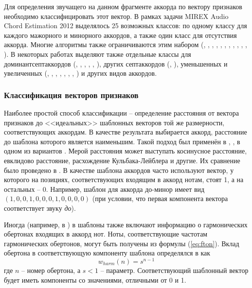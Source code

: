Для определения звучащего на данном фрагменте аккорда по вектору признаков
необходимо классифицировать этот вектор. В рамках задачи MIREX Audio Chord
Estimation 2012 выделялось 25 возможных классов: по одному классу для каждого
мажорного и минорного аккордов, а также один класс для отсутствия аккорда.
Многие алгоритмы также ограничиваются этим набором (\cite{Bello2005},
\cite{Lee2006}, \cite{Khadkevich2009}, \cite{Oudre2009}, \cite{Weller2009},
\cite{Cho2010}, \cite{Rocher2010}, \cite{Cho2011}, \cite{Jiang2011},
\cite{Ni2011}, \cite{Chen2012}, \cite{Humphrey2012}). В некоторых работах
выделяют также отдельные классы для доминантсептаккордов (\cite{Sheh2003},
\cite{Mauch2008}, \cite{Zhang2008}, \cite{Mauch2009}, \cite{Mauch2010},
\cite{DeHaas2012}), других септаккордов (\cite{Sheh2003}, \cite{Mauch2010}),
уменьшенных и увеличенных (\cite{Sheh2003}, \cite{Burgoyne2007},
\cite{Lee2008}, \cite{Mauch2008}, \cite{Sumi2008}, \cite{Mauch2009},
\cite{Mauch2010}, \cite{Ni2012}) и других видов аккордов.

\subsubsection{Классификация векторов признаков}

Наиболее простой способ классификации -- определение расстояния от вектора
признаков до <<идеальных>> шаблонных векторов той же размерности,
соответствующих аккордам. В качестве результата выбирается аккорд, расстояние до
шаблона которого является наименьшим. Такой подход был применён в
\cite{Lee2006}, \cite{Oudre2009}, в одном из вариантов \cite{Jiang2011}. Мерой
расстояния может выступать косинусное расстояние, евклидово расстояние,
расхождение Кульбака-Лейблера и другие. Их сравнение было проведено в
\cite{Oudre2009}. В качестве шаблона аккордов часто используют вектор, у
которого на позициях, соответствующих входящим в аккорд нотам, стоят 1, а на
остальных -- 0. Например, шаблон для аккорда до-минор имеет вид
$(1,0,0,1,0,0,0,1,0,0,0,0)$ (при условии, что первая компонента вектора
соответствует звуку \emph{до}).

Иногда (например, в \cite{Oudre2009}) в шаблоны также включают информацию о
гармонических обертонах входящих в аккорд нот. Ноты, соответствующие частотам
гармонических обертонов, могут быть получены из формулы (\ref{eq:fton}). Вклад
обертона в соответствующую компоненту шаблона определялся в \cite{Gomez2006} как
$$w_{harm}(n) = s^{n-1}$$
где $n$ -- номер обертона, а $s < 1$ -- параметр. Соответствующий шаблонный
вектор будет иметь компоненты со значениями, отличными от 0 и 1.


